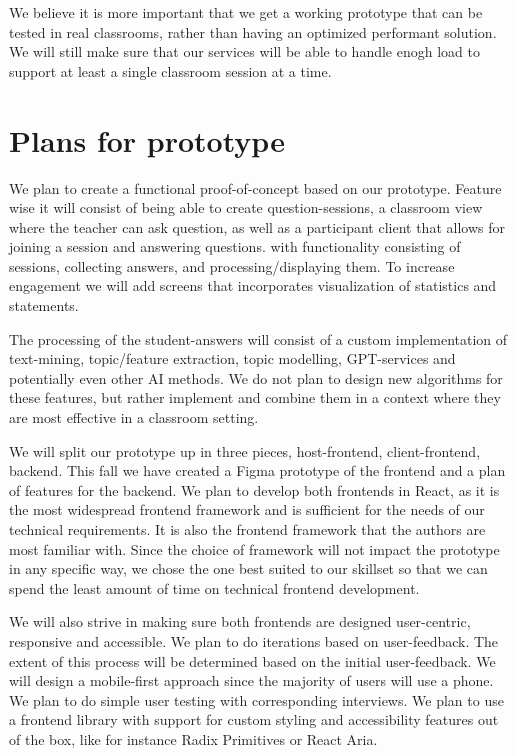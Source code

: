We believe it is more important that we get a working prototype that can be tested in real classrooms, rather than having an optimized performant solution. We will still make sure that our services will be able to handle enogh load to support at least a single classroom session at a time.


\section{Plans for prototype}
We plan to create a functional proof-of-concept based on our prototype. Feature wise it will consist of being able to create question-sessions, a classroom view where the teacher can ask question, as well as a participant client that allows for joining a session and answering questions. with functionality consisting of sessions, collecting answers, and processing/displaying them. To increase engagement we will add screens that incorporates visualization of statistics and statements.  

The processing of the student-answers will consist of a custom implementation of text-mining, topic/feature extraction, topic modelling, GPT-services and potentially even other AI methods. We do not plan to design new algorithms for these features, but rather implement and combine them in a context where they are most effective in a classroom setting. 

We will split our prototype up in three pieces, host-frontend, client-frontend, backend. This fall we have created a Figma prototype of the frontend and a plan of features for the backend. We plan to develop both frontends in React, as it is the most widespread frontend framework and is sufficient for the needs of our technical requirements. It is also the frontend framework that the authors are most familiar with. Since the choice of framework will not impact the prototype in any specific way, we chose the one best suited to our skillset so that we can spend the least amount of time on technical frontend development.

We will also strive in making sure both frontends are designed user-centric, responsive and accessible. We plan to do iterations based on user-feedback. The extent of this process will be determined based on the initial user-feedback. We will design a mobile-first approach since the majority of users will use a phone. We plan to do simple user testing with corresponding interviews. We plan to use a frontend library with support for custom styling and accessibility features out of the box, like for instance Radix Primitives or React Aria.


